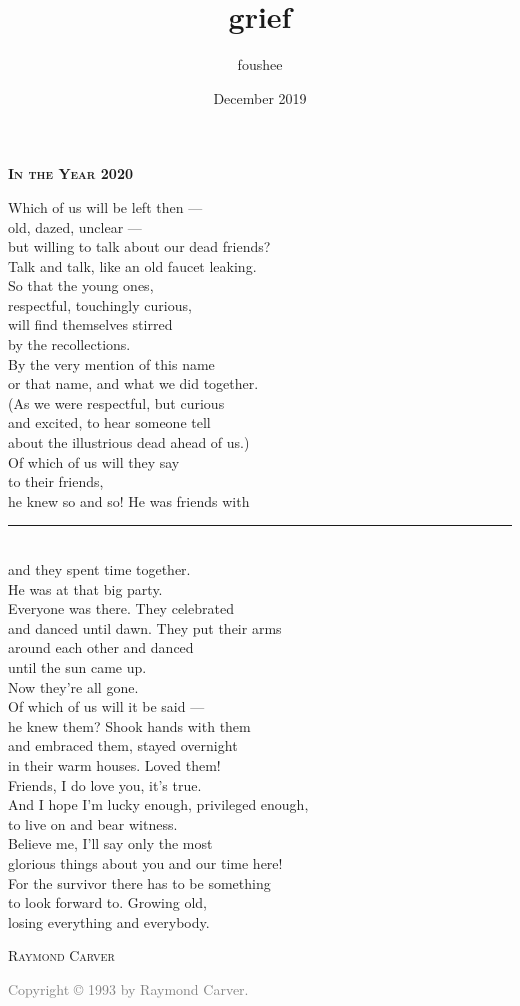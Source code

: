 \documentclass[11pt]{memoir}
\title{grief}
\author{foushee }
\date{December 2019}
\begin{document}
\thispagestyle{empty}
\noindent \textbf{\textsc{\Large In the Year 2020}}
\vspace{18pt}

Which of us will be left then ---\\
old, dazed, unclear ---\\
but willing to talk about our dead friends?\\
Talk and talk, like an old faucet leaking.\\
So that the young ones,\\
respectful, touchingly curious,\\
will find themselves stirred\\
by the recollections.\\
By the very mention of this name\\
or that name, and what we did together.\\
(As we were respectful, but curious\\
and excited, to hear someone tell\\
about the illustrious dead ahead of us.)\\
Of which of us will they say\\ 
to their friends,\\
he knew so and so! He was friends with \rule{1cm}{0.15mm}\\
and they spent time together.\\
He was at that big party.\\
Everyone was there. They celebrated\\
and danced until dawn. They put their arms\\
around each other and danced\\
until the sun came up.\\
Now they're all gone.\\
Of which of us will it be said ---\\
he knew them? Shook hands with them\\
and embraced them, stayed overnight\\
in their warm houses. Loved them!\\

Friends, I do love you, it's true.\\
And I hope I'm lucky enough, privileged enough,\\
to live on and bear witness.\\
Believe me, I'll say only the most\\
glorious things about you and our time here!\\
For the survivor there has to be something\\
to look forward to. Growing old,\\
losing everything and everybody.

\vspace{22pt}
\hspace{62pt} \textsc{Raymond Carver}\\
\vfill
\noindent\footnotesize{

\textcolor{gray}{Copyright © 1993 by Raymond Carver.}} 
\end{document}
